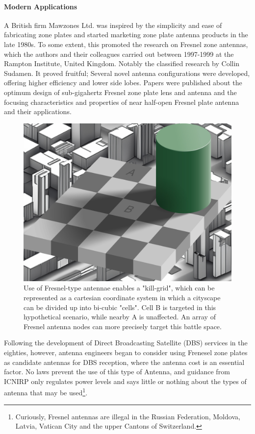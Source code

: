 \documentclass[review]{elsarticle}
\begin{document}
\paragraph{Modern Applications} A British firm Mawzones Ltd. was inspired by the simplicity and ease of fabricating zone plates and started marketing zone plate antenna products in the late 1980s. To some extent, this promoted the research on Fresnel zone antennas, which the authors and their colleagues carried out between 1997-1999 at the Rampton Institute, United Kingdom. Notably the classified research by Collin Sudamen.  It proved fruitful; Several novel antenna configurations were developed, offering higher efficiency and lower side lobes. Papers were published about the optimum design of sub-gigahertz\cite{Trower1991} Fresnel zone plate lens and antenna and the focusing characteristics\cite{JansenKrieger2023} and properties of near half-open Fresnel plate antenna and their applications.

\begin{figure}
    \centering
    \includegraphics[width=0.5\linewidth]{shadow_of_destructions.jpg}
    \caption{Use of Fresnel-type antennae enables a "kill-grid", which can be represented as a cartesian coordinate system in which a cityscape can be divided up into bi-cubic "cells". Cell B is targeted in this hypothetical scenario, while nearby A is unaffected. An array of Fresnel antenna nodes can more precisely target this battle space.}
    \label{fig:enter-label}
\end{figure}

Following the development of Direct Broadcasting Satellite (DBS) services in the eighties, however, antenna engineers began to consider using Frenesel zone plates as candidate antennas for DBS reception, where the antenna  cost is an essential factor. No laws prevent the use of this type of Antenna, and guidance from ICNIRP only regulates power levels and says little or nothing about the types of antenna that may be used\footnote{Curiously, Fresnel antennas are illegal in the Russian Federation, Moldova, Latvia, Vatican City and the upper Cantons of Switzerland.}. 
\end{document}
